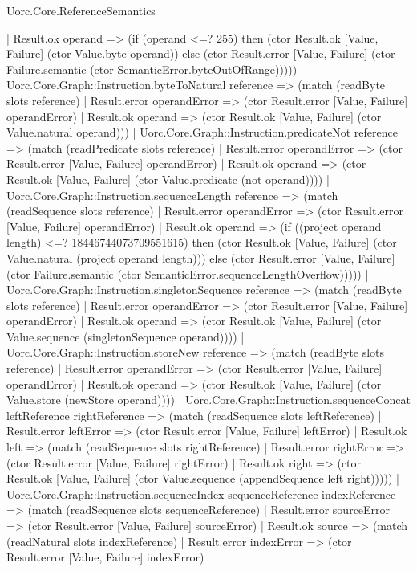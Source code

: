 \begin{lexlean}{Uorc.Core.ReferenceSemantics}
\begin{semanticmodule}
{      | Result.ok operand => (if (operand <=? 255) then (ctor Result.ok [Value, Failure] (ctor Value.byte operand)) else (ctor Result.error [Value, Failure] (ctor Failure.semantic (ctor SemanticError.byteOutOfRange)))))
    | Uorc.Core.Graph::Instruction.byteToNatural reference => (match (readByte slots reference)
      | Result.error operandError => (ctor Result.error [Value, Failure] operandError)
      | Result.ok operand => (ctor Result.ok [Value, Failure] (ctor Value.natural operand)))
    | Uorc.Core.Graph::Instruction.predicateNot reference => (match (readPredicate slots reference)
      | Result.error operandError => (ctor Result.error [Value, Failure] operandError)
      | Result.ok operand => (ctor Result.ok [Value, Failure] (ctor Value.predicate (not operand))))
    | Uorc.Core.Graph::Instruction.sequenceLength reference => (match (readSequence slots reference)
      | Result.error operandError => (ctor Result.error [Value, Failure] operandError)
      | Result.ok operand => (if ((project operand length) <=? 18446744073709551615) then (ctor Result.ok [Value, Failure] (ctor Value.natural (project operand length))) else (ctor Result.error [Value, Failure] (ctor Failure.semantic (ctor SemanticError.sequenceLengthOverflow)))))
    | Uorc.Core.Graph::Instruction.singletonSequence reference => (match (readByte slots reference)
      | Result.error operandError => (ctor Result.error [Value, Failure] operandError)
      | Result.ok operand => (ctor Result.ok [Value, Failure] (ctor Value.sequence (singletonSequence operand))))
    | Uorc.Core.Graph::Instruction.storeNew reference => (match (readByte slots reference)
      | Result.error operandError => (ctor Result.error [Value, Failure] operandError)
      | Result.ok operand => (ctor Result.ok [Value, Failure] (ctor Value.store (newStore operand))))
    | Uorc.Core.Graph::Instruction.sequenceConcat leftReference rightReference => (match (readSequence slots leftReference)
      | Result.error leftError => (ctor Result.error [Value, Failure] leftError)
      | Result.ok left => (match (readSequence slots rightReference)
        | Result.error rightError => (ctor Result.error [Value, Failure] rightError)
        | Result.ok right => (ctor Result.ok [Value, Failure] (ctor Value.sequence (appendSequence left right)))))
    | Uorc.Core.Graph::Instruction.sequenceIndex sequenceReference indexReference => (match (readSequence slots sequenceReference)
      | Result.error sourceError => (ctor Result.error [Value, Failure] sourceError)
      | Result.ok source => (match (readNatural slots indexReference)
        | Result.error indexError => (ctor Result.error [Value, Failure] indexError)
}
\end{semanticmodule}
\end{lexlean}
